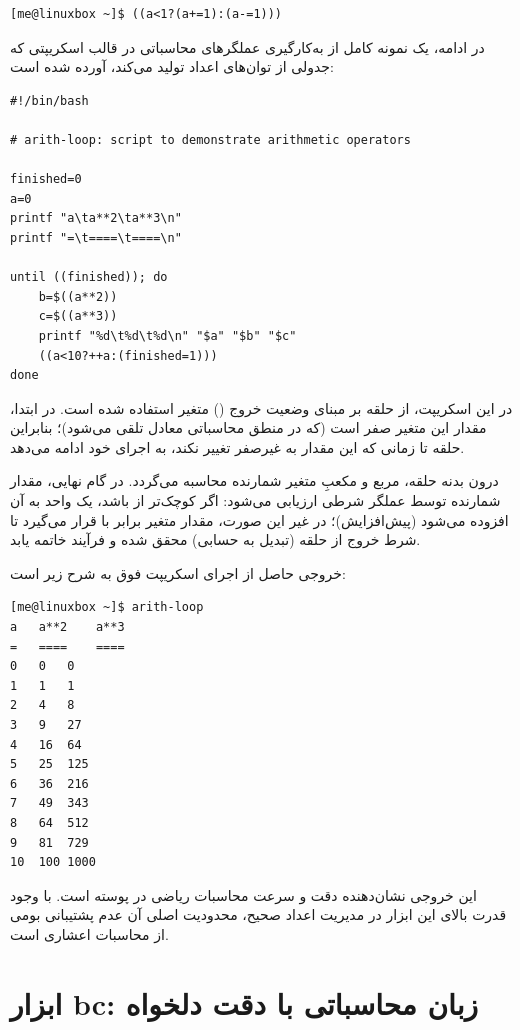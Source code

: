 \begin{latin}
\begin{lstlisting}
[me@linuxbox ~]$ ((a<1?(a+=1):(a-=1)))
\end{lstlisting}
\end{latin}

در ادامه، یک نمونه کامل از به‌کارگیری عملگرهای محاسباتی در قالب اسکریپتی که جدولی از توان‌های اعداد تولید می‌کند، آورده شده است:

\begin{latin}
\begin{lstlisting}
#!/bin/bash

# arith-loop: script to demonstrate arithmetic operators

finished=0
a=0
printf "a\ta**2\ta**3\n"
printf "=\t====\t====\n"

until ((finished)); do
    b=$((a**2))
    c=$((a**3))
    printf "%d\t%d\t%d\n" "$a" "$b" "$c"
    ((a<10?++a:(finished=1)))
done
\end{lstlisting}
\end{latin}

در این اسکریپت، از حلقه  بر مبنای وضعیت خروج () متغیر  استفاده شده است. در ابتدا، مقدار این متغیر صفر است (که در منطق محاسباتی معادل  تلقی می‌شود)؛ بنابراین حلقه تا زمانی که این مقدار به غیرصفر تغییر نکند، به اجرای خود ادامه می‌دهد.

درون بدنه حلقه، مربع و مکعبِ متغیر شمارنده  محاسبه می‌گردد. در گام نهایی، مقدار شمارنده توسط عملگر شرطی ارزیابی می‌شود: اگر  کوچک‌تر از  باشد، یک واحد به آن افزوده می‌شود (پیش‌افزایش)؛ در غیر این صورت، مقدار متغیر  برابر با  قرار می‌گیرد تا شرط خروج از حلقه (تبدیل به  حسابی) محقق شده و فرآیند خاتمه یابد.

خروجی حاصل از اجرای اسکریپت فوق به شرح زیر است:

\begin{latin}
\begin{lstlisting}
[me@linuxbox ~]$ arith-loop
a	a**2	a**3
=	====	====
0	0	0
1	1	1
2	4	8
3	9	27
4	16	64
5	25	125
6	36	216
7	49	343
8	64	512
9	81	729
10	100	1000
\end{lstlisting}
\end{latin}

این خروجی نشان‌دهنده دقت و سرعت محاسبات ریاضی در پوسته  است. با وجود قدرت بالای این ابزار در مدیریت اعداد صحیح، محدودیت اصلی آن عدم پشتیبانی بومی از محاسبات اعشاری است.

\section{ابزار bc: زبان محاسباتی با دقت دلخواه}

